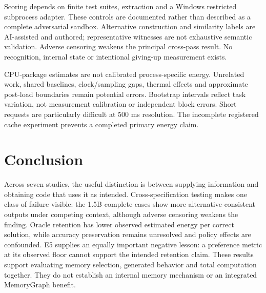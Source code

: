 \documentclass[10pt,a4paper,twocolumn]{article}
\begin{document}
Scoring depends on finite test suites, extraction and a Windows restricted
subprocess adapter. These controls are documented rather than described as a
complete adversarial sandbox. Alternative construction and similarity labels
are AI-assisted and authored; representative witnesses are not exhaustive
semantic validation. Adverse censoring weakens the principal cross-pass result.
No recognition, internal state or intentional giving-up measurement exists.

CPU-package estimates are not calibrated process-specific energy. Unrelated
work, shared baselines, clock/sampling gaps, thermal effects and approximate
post-load boundaries remain potential errors. Bootstrap intervals reflect task
variation, not measurement calibration or independent block errors. Short
requests are particularly difficult at 500 ms resolution. The incomplete
registered cache experiment prevents a completed primary energy claim.

\section{Conclusion}
Across seven studies, the useful distinction is between supplying information
and obtaining code that uses it as intended. Cross-specification testing makes
one class of failure visible: the 1.5B complete cases show more
alternative-consistent outputs under competing context, although adverse
censoring weakens the finding. Oracle retention has lower observed estimated
energy per correct solution, while accuracy preservation remains unresolved
and policy effects are confounded. E5 supplies an equally important negative
lesson: a preference metric at its observed floor cannot support the intended
retention claim. These results support evaluating memory selection, generated
behavior and total computation together. They do not establish an internal
memory mechanism or an integrated MemoryGraph benefit.
\end{document}
